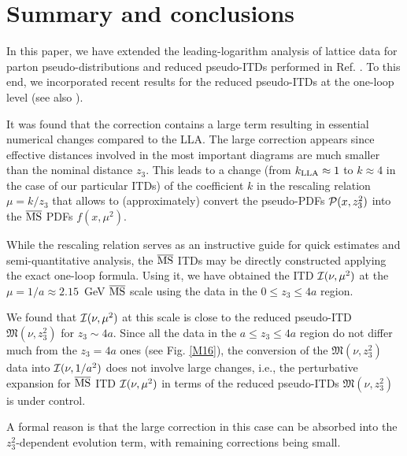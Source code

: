 \section{Summary and conclusions}

 In this paper, we  have extended   the leading-logarithm
 analysis of lattice data for  parton pseudo-distributions
 and reduced pseudo-ITDs
 performed in Ref. \cite{Orginos:2017kos}.
 To this end, we incorporated
  recent  results for the reduced pseudo-ITDs at   the one-loop level   \cite{Radyushkin:2017lvu}
 (see also \cite{Ji:2017rah,Izubuchi:2018srq}).



 It was  found that the correction contains a  large term
 resulting  in essential numerical  changes  compared to  the LLA.
 The   large correction appears since
 effective distances involved in the most important diagrams
 are much smaller than the nominal distance $z_3$.
 This  leads to a  change
 (from $k_{\rm LLA} \approx 1$ to $k \approx 4$  in the case of our
 particular ITDs)  of the
 coefficient $k$ in  the
 rescaling relation $\mu = k/z_3$  that allows to (approximately)
 convert  the pseudo-PDFs ${\cal P} (x,z_3^2)$ into the $\overline{\rm MS}$
 PDFs $f(x,\mu^2)$.





While the  rescaling relation serves as an
instructive guide for quick estimates and  semi-quantitative analysis,
the $\overline{\rm MS}$ ITDs may be directly constructed applying   the
exact one-loop formula.  Using it, we have obtained
 the
   ITD ${\cal I} (\nu, \mu^2)$ at the \mbox{$\mu=1/a \approx 2.15$ GeV}
   $\overline{\rm MS}$ scale
         using the data in the  \mbox{$0\leq z_3 \leq 4a$}   region.

        We  found that ${\cal I} (\nu, \mu^2)$ at this scale is  close
         to the reduced pseudo-ITD ${\mathfrak M} (\nu,z_3^2)$  for $z_3\sim 4a$.
         Since  all the data in the $a\leq z_3 \leq 4a$ region do not differ much from
         the $z_3=4a$ ones (see Fig. \ref{M16}), the conversion of
         the ${\mathfrak M} (\nu,z_3^2)$ data into ${\cal I} (\nu, 1/a^2)$
         does not involve large changes, i.e.,
 the perturbative expansion for   $\overline{\rm MS}$  ITD ${\cal I} (\nu, \mu^2)$
 in terms of the reduced
   pseudo-ITDs ${\mathfrak M} (\nu,z_3^2)$    is  under control.

A  formal reason is that the   large  correction in this  case can  be
    absorbed into the $z_3^2$-dependent evolution term,
    with remaining corrections being small.

